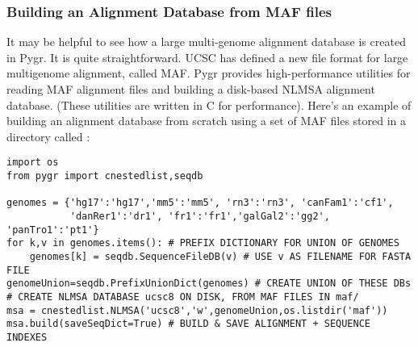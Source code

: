 \documentclass{howto}
\begin{document}
\subsubsection{Building an Alignment Database from MAF files}
It may be helpful to see how a large multi-genome alignment database
is created in Pygr.  It is quite straightforward.
UCSC has defined a new file format for large multigenome alignment,
called MAF.  Pygr provides high-performance utilities for reading
MAF alignment files and building a disk-based NLMSA alignment database.
(These utilities are written in C for performance).  Here's an
example of building an alignment database from scratch using a
set of MAF files stored in a directory called :

\begin{verbatim}
import os
from pygr import cnestedlist,seqdb

genomes = {'hg17':'hg17','mm5':'mm5', 'rn3':'rn3', 'canFam1':'cf1', 
           'danRer1':'dr1', 'fr1':'fr1','galGal2':'gg2', 'panTro1':'pt1'}
for k,v in genomes.items(): # PREFIX DICTIONARY FOR UNION OF GENOMES
    genomes[k] = seqdb.SequenceFileDB(v) # USE v AS FILENAME FOR FASTA FILE
genomeUnion=seqdb.PrefixUnionDict(genomes) # CREATE UNION OF THESE DBs
# CREATE NLMSA DATABASE ucsc8 ON DISK, FROM MAF FILES IN maf/
msa = cnestedlist.NLMSA('ucsc8','w',genomeUnion,os.listdir('maf'))
msa.build(saveSeqDict=True) # BUILD & SAVE ALIGNMENT + SEQUENCE INDEXES
\end{verbatim}
\end{document}
